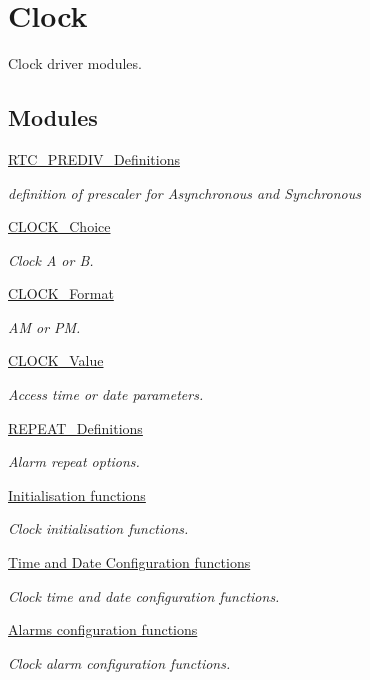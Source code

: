 \hypertarget{group___clock}{}\section{Clock}
\label{group___clock}


Clock driver modules.  


\subsection*{Modules}
\begin{DoxyCompactItemize}
\item 
\hyperlink{group___r_t_c___p_r_e_d_i_v___definitions}{R\+T\+C\+\_\+\+P\+R\+E\+D\+I\+V\+\_\+\+Definitions}
\begin{DoxyCompactList}\small\item\em definition of prescaler for Asynchronous and Synchronous \end{DoxyCompactList}\item 
\hyperlink{group___c_l_o_c_k___choice}{C\+L\+O\+C\+K\+\_\+\+Choice}
\begin{DoxyCompactList}\small\item\em Clock A or B. \end{DoxyCompactList}\item 
\hyperlink{group___c_l_o_c_k___format}{C\+L\+O\+C\+K\+\_\+\+Format}
\begin{DoxyCompactList}\small\item\em AM or PM. \end{DoxyCompactList}\item 
\hyperlink{group___c_l_o_c_k___value}{C\+L\+O\+C\+K\+\_\+\+Value}
\begin{DoxyCompactList}\small\item\em Access time or date parameters. \end{DoxyCompactList}\item 
\hyperlink{group___r_e_p_e_a_t___definitions}{R\+E\+P\+E\+A\+T\+\_\+\+Definitions}
\begin{DoxyCompactList}\small\item\em Alarm repeat options. \end{DoxyCompactList}\item 
\hyperlink{group___clock___init}{Initialisation functions}
\begin{DoxyCompactList}\small\item\em Clock initialisation functions. \end{DoxyCompactList}\item 
\hyperlink{group___clock___time___date}{Time and Date Configuration functions}
\begin{DoxyCompactList}\small\item\em Clock time and date configuration functions. \end{DoxyCompactList}\item 
\hyperlink{group___clock___alarms}{Alarms configuration functions}
\begin{DoxyCompactList}\small\item\em Clock alarm configuration functions. \end{DoxyCompactList}\end{DoxyCompactItemize}
